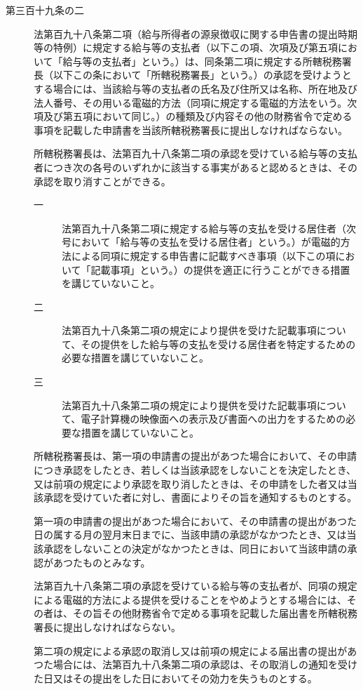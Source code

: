 \documentclass[twocolumn,a4j,10pt]{ltjtarticle}
\begin{document}
\begin{description}
\item[第三百十九条の二]法第百九十八条第二項（給与所得者の源泉徴収に関する申告書の提出時期等の特例）に規定する給与等の支払者（以下この項、次項及び第五項において「給与等の支払者」という。）は、同条第二項に規定する所轄税務署長（以下この条において「所轄税務署長」という。）の承認を受けようとする場合には、当該給与等の支払者の氏名及び住所又は名称、所在地及び法人番号、その用いる電磁的方法（同項に規定する電磁的方法をいう。次項及び第五項において同じ。）の種類及び内容その他の財務省令で定める事項を記載した申請書を当該所轄税務署長に提出しなければならない。
\item[]所轄税務署長は、法第百九十八条第二項の承認を受けている給与等の支払者につき次の各号のいずれかに該当する事実があると認めるときは、その承認を取り消すことができる。
\begin{description}
\item[一]法第百九十八条第二項に規定する給与等の支払を受ける居住者（次号において「給与等の支払を受ける居住者」という。）が電磁的方法による同項に規定する申告書に記載すべき事項（以下この項において「記載事項」という。）の提供を適正に行うことができる措置を講じていないこと。
\item[二]法第百九十八条第二項の規定により提供を受けた記載事項について、その提供をした給与等の支払を受ける居住者を特定するための必要な措置を講じていないこと。
\item[三]法第百九十八条第二項の規定により提供を受けた記載事項について、電子計算機の映像面への表示及び書面への出力をするための必要な措置を講じていないこと。
\end{description}
\item[]所轄税務署長は、第一項の申請書の提出があつた場合において、その申請につき承認をしたとき、若しくは当該承認をしないことを決定したとき、又は前項の規定により承認を取り消したときは、その申請をした者又は当該承認を受けていた者に対し、書面によりその旨を通知するものとする。
\item[]第一項の申請書の提出があつた場合において、その申請書の提出があつた日の属する月の翌月末日までに、当該申請の承認がなかつたとき、又は当該承認をしないことの決定がなかつたときは、同日において当該申請の承認があつたものとみなす。
\item[]法第百九十八条第二項の承認を受けている給与等の支払者が、同項の規定による電磁的方法による提供を受けることをやめようとする場合には、その者は、その旨その他財務省令で定める事項を記載した届出書を所轄税務署長に提出しなければならない。
\item[]第二項の規定による承認の取消し又は前項の規定による届出書の提出があつた場合には、法第百九十八条第二項の承認は、その取消しの通知を受けた日又はその提出をした日においてその効力を失うものとする。
\end{description}
\end{document}
